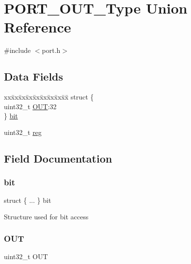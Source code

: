 \hypertarget{union_p_o_r_t___o_u_t___type}{}\section{P\+O\+R\+T\+\_\+\+O\+U\+T\+\_\+\+Type Union Reference}
\label{union_p_o_r_t___o_u_t___type}


{\ttfamily \#include $<$port.\+h$>$}

\subsection*{Data Fields}
\begin{DoxyCompactItemize}
\item 
\begin{tabbing}
xx\=xx\=xx\=xx\=xx\=xx\=xx\=xx\=xx\=\kill
struct \{\\
\>uint32\_t \mbox{\hyperlink{union_p_o_r_t___o_u_t___type_a851d3bfd5c730069acca56cf03a3c559}{OUT}}:32\\
\} \mbox{\hyperlink{union_p_o_r_t___o_u_t___type_aaab5f4e0ee00b728b8db26625a2916f0}{bit}}\\

\end{tabbing}\item 
uint32\+\_\+t \mbox{\hyperlink{union_p_o_r_t___o_u_t___type_a6b91636401516a477989a336376d7b40}{reg}}
\end{DoxyCompactItemize}


\subsection{Field Documentation}
\mbox{\label{union_p_o_r_t___o_u_t___type_aaab5f4e0ee00b728b8db26625a2916f0}} 
\subsubsection{\texorpdfstring{bit}{bit}}
{\footnotesize\ttfamily struct \{ ... \}   bit}

Structure used for bit access \mbox{\label{union_p_o_r_t___o_u_t___type_a851d3bfd5c730069acca56cf03a3c559}} 
\subsubsection{\texorpdfstring{OUT}{OUT}}
{\footnotesize\ttfamily uint32\+\_\+t O\+UT}


